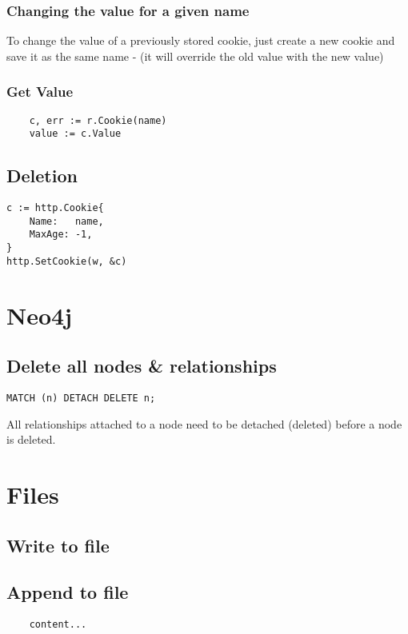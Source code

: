\documentclass[]{article}
\begin{document}
\subsubsection{Changing the value for a given name}
To change the value of a previously stored cookie, just create a new cookie and save it as the same name - (it will override the old value with the new value)

\subsubsection{Get Value}
\begin{lstlisting}
	c, err := r.Cookie(name)
	value := c.Value
\end{lstlisting}

\subsection{Deletion}

\begin{lstlisting}
c := http.Cookie{
	Name:   name,
	MaxAge: -1,
}
http.SetCookie(w, &c)
\end{lstlisting}

\section{Neo4j}
\subsection{Delete all nodes \& relationships}
\begin{lstlisting}
MATCH (n) DETACH DELETE n;
\end{lstlisting}
All relationships attached to a node need to be detached (deleted) before a node is deleted.
\section{Files}
\subsection{Write to file}

\subsection{Append to file}
\begin{lstlisting}
	content...
\end{lstlisting}
\end{document}
